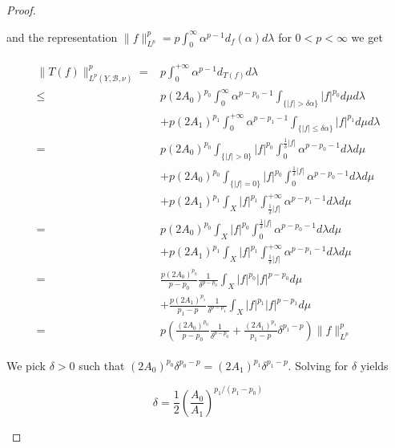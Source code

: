 \begin{proof}
\begin{enumerate}[label = \textbf{(\roman*.)}]
\begin{enumerate}[label = \textbf{\alph*.}]
		and the representation $\displaystyle \|f\|^p_{L^p} = p \int_0^{\infty} \alpha^{p-1}d_f(\alpha) d\lambda$ for $ 0 < p < \infty$ we get

		\begin{gather}
			\begin{aligned}
				\|T(f)\|^p_{L^p(Y,\mathcal{B},\nu)} = & p\int_0^{+\infty}\alpha^{p-1}d_{T(f)} d\lambda\\
				\leqslant & p(2A_0)^{p_0}\int_0^{\infty}\alpha^{p-p_0-1} \int_{\{\vert f \vert > \delta \alpha\}} \vert f\vert^{p_0}d\mu d\lambda\\
				& + p(2A_1)^{p_1}\int_0^{+\infty}\alpha^{p-p_1-1} \int_{\{\vert f \vert \leqslant \delta \alpha\}} \vert f \vert^{p_1}d\mu d\lambda\\
				= & p(2A_0)^{p_0}\int_{\{\vert f \vert > 0\}} \vert f \vert^{p_0} \int_0^{\frac{1}{\delta}\vert f\vert}\alpha^{p-p_0-1} d\lambda d\mu\\
				& + p(2A_0)^{p_0}\int_{\{\vert f \vert = 0\}} \vert f \vert^{p_0} \int_0^{\frac{1}{\delta}\vert f\vert}\alpha^{p-p_0-1} d\lambda d\mu\\
				& + p(2A_1)^{p_1}\int_X \vert f\vert^{p_1} \int_{\frac{1}{\delta}\vert f\vert}^{+\infty}\alpha^{p - p_1 - 1} d\lambda d\mu\\
				= & p(2A_0)^{p_0}\int_X \vert f \vert^{p_0} \int_0^{\frac{1}{\delta}\vert f\vert}\alpha^{p-p_0-1} d\lambda d\mu\\
				& + p(2A_1)^{p_1}\int_X \vert f\vert^{p_1} \int_{\frac{1}{\delta}\vert f\vert}^{+\infty}\alpha^{p - p_1 - 1} d\lambda d\mu\\
				= & \frac{p(2A_0)^{p_0}}{p-p_0}\frac{1}{\delta^{p-p_0}}\int_X \vert f \vert^{p_0}\vert f \vert^{p-p_0} d\mu\\
				& + \frac{p(2A_1)^{p_1}}{p_1-p}\frac{1}{\delta^{p-p_1}}\int_X \vert f \vert^{p_1} \vert f\vert^{p-p_1}d\mu\\
				= & p\left( \frac{(2A_0)^{p_0}}{p - p_0}\frac{1}{\delta^{p - p_0}} + \frac{(2A_1)^{p_1}}{p_1 - p}\delta^{p_1 - p} \right)\|f\|_{L^p}^p
			\end{aligned}
			\label{est:Tfp}
		\end{gather}

		We pick $\delta > 0$ such that $(2A_0)^{p_0}\delta^{p_0 - p} = (2A_1)^{p_1}\delta^{p_1 - p}$. Solving for $\delta$ yields 

		\begin{equation}
			\delta = \frac{1}{2} \left( \frac{A_0}{A_1}\right)^{p_1/(p_1 - p_0)}
		\end{equation}


\end{enumerate}
\end{enumerate}
\end{proof}
